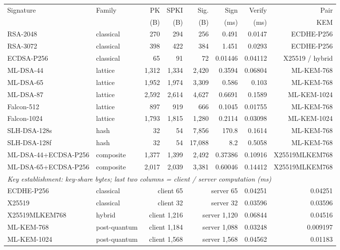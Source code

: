 \begin{tabular}{@{}llrrrrrr@{}}
\toprule
Signature & Family & PK & SPKI & Sig. & Sign & Verify & Pair \\
 & & (B) & (B) & (B) & (ms) & (ms) & KEM \\
\midrule
RSA-2048 & classical & 270 & 294 & 256 & 0.491 & 0.0147 & ECDHE-P256 \\
RSA-3072 & classical & 398 & 422 & 384 & 1.451 & 0.0293 & ECDHE-P256 \\
ECDSA-P256 & classical & 65 & 91 & 72 & 0.01446 & 0.04112 & X25519 / hybrid \\
ML-DSA-44 & lattice & 1{,}312 & 1{,}334 & 2{,}420 & 0.3594 & 0.06804 & ML-KEM-768 \\
ML-DSA-65 & lattice & 1{,}952 & 1{,}974 & 3{,}309 & 0.586 & 0.103 & ML-KEM-768 \\
ML-DSA-87 & lattice & 2{,}592 & 2{,}614 & 4{,}627 & 0.6691 & 0.1589 & ML-KEM-1024 \\
Falcon-512 & lattice & 897 & 919 & 666 & 0.1045 & 0.01755 & ML-KEM-768 \\
Falcon-1024 & lattice & 1{,}793 & 1{,}815 & 1{,}280 & 0.2114 & 0.03098 & ML-KEM-1024 \\
SLH-DSA-128s & hash & 32 & 54 & 7{,}856 & 170.8 & 0.1614 & ML-KEM-768 \\
SLH-DSA-128f & hash & 32 & 54 & 17{,}088 & 8.2 & 0.5058 & ML-KEM-768 \\
ML-DSA-44+ECDSA-P256 & composite & 1{,}377 & 1{,}399 & 2{,}492 & 0.37386 & 0.10916 & X25519MLKEM768 \\
ML-DSA-65+ECDSA-P256 & composite & 2{,}017 & 2{,}039 & 3{,}381 & 0.60046 & 0.14412 & X25519MLKEM768 \\
\midrule
\multicolumn{8}{l}{\textit{Key establishment: key-share bytes; last two columns = client / server computation (ms)}} \\
\quad ECDHE-P256 & classical & \multicolumn{2}{r}{client 65} & \multicolumn{2}{r}{server 65} & 0.04251 & 0.04251 \\
\quad X25519 & classical & \multicolumn{2}{r}{client 32} & \multicolumn{2}{r}{server 32} & 0.03596 & 0.03596 \\
\quad X25519MLKEM768 & hybrid & \multicolumn{2}{r}{client 1{,}216} & \multicolumn{2}{r}{server 1{,}120} & 0.06844 & 0.04516 \\
\quad ML-KEM-768 & post-quantum & \multicolumn{2}{r}{client 1{,}184} & \multicolumn{2}{r}{server 1{,}088} & 0.03248 & 0.009197 \\
\quad ML-KEM-1024 & post-quantum & \multicolumn{2}{r}{client 1{,}568} & \multicolumn{2}{r}{server 1{,}568} & 0.04562 & 0.01183 \\
\bottomrule
\end{tabular}
